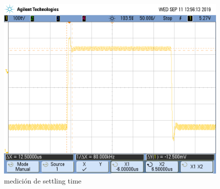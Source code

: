 \documentclass{article}
\begin{document}
\begin{figure}[H]
\centering
\includegraphics[width=0.8\linewidth]{images/05vpp/settling_time.PNG}
\caption{medición de settling time}
\label{fig:settling_time}
\end{figure}
\end{document}
